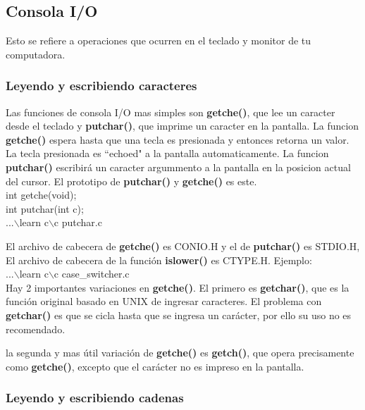 \documentclass[]{article}
\begin{document}
	\subsection{Consola I/O}
	
	Esto se refiere a operaciones que ocurren en el teclado y monitor de tu computadora.
	
	\subsubsection{Leyendo y escribiendo caracteres}
	
	Las funciones de consola I/O mas simples son \textbf{getche()}, que lee un caracter desde el teclado y \textbf{putchar()}, que imprime un caracter en la pantalla. La funcion \textbf{getche()} espera hasta que una tecla es presionada y entonces retorna un valor. La tecla presionada es ``echoed" a la pantalla automaticamente. La funcion \textbf{putchar()} escribirá un caracter argummento a la pantalla en la posicion actual del cursor. El prototipo de \textbf{putchar()} y \textbf{getche()} es este.\\
	
	int getche(void);\\
	
	int putchar(int c);\\
	
	...$\backslash$learn c$\backslash$c	putchar.c
	
	El archivo de cabecera de \textbf{getche()} es CONIO.H y el de \textbf{putchar()} es STDIO.H, El archivo de cabecera de la función \textbf{islower()} es CTYPE.H. Ejemplo:\\
	
	...$\backslash$learn c$\backslash$c case\_switcher.c\\
	
	Hay 2 importantes variaciones en \textbf{getche()}. El primero es \textbf{getchar()}, que es la función original basado en UNIX de ingresar caracteres. El problema con \textbf{getchar()} es que se cicla hasta que se ingresa un carácter, por ello su uso no es recomendado.
	
	la segunda y mas útil variación de \textbf{getche()} es \textbf{getch()}, que opera precisamente como \textbf{getche()}, excepto que el carácter no es impreso en la pantalla.
	
	\subsubsection{Leyendo y escribiendo cadenas}
	
\end{document}
